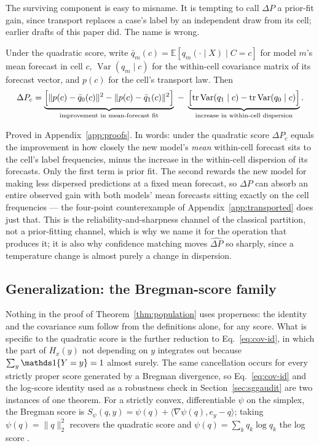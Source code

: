 The surviving component is easy to misname. It is tempting to call $\Delta P$ a prior-fit
gain, since transport replaces a case's label by an independent draw from its cell; earlier
drafts of this paper did. The name is wrong.

\begin{proposition}\label{prop:transported}
Under the quadratic score, write $\bar q_m(c)=\mathbb E[q_m(\cdot\mid X)\mid C=c]$ for
model $m$'s mean forecast in cell $c$, $\operatorname{Var}(q_m\mid c)$ for the
within-cell covariance matrix of its forecast vector, and $p(c)$ for the cell's transport
law. Then
\begin{equation}
\Delta P_c=
\underbrace{\Bigl[\lVert p(c)-\bar q_0(c)\rVert^2-\lVert p(c)-\bar q_1(c)\rVert^2\Bigr]}
_{\text{improvement in mean-forecast fit}}
\;-\;
\underbrace{\Bigl[\operatorname{tr}\operatorname{Var}(q_1\mid c)-
\operatorname{tr}\operatorname{Var}(q_0\mid c)\Bigr]}_{\text{increase in within-cell dispersion}} .
\label{eq:transported-composition}
\end{equation}
\end{proposition}

\noindent
Proved in Appendix~\ref{app:proofs}. In words: under the quadratic score $\Delta P_c$ equals
the improvement in how closely the new model's \emph{mean} within-cell forecast sits to the
cell's label frequencies, minus the increase in the within-cell dispersion of its forecasts. Only the first term is prior fit.
The second rewards the new model for making less dispersed predictions at a fixed mean
forecast, so $\Delta P$ can absorb an entire observed gain with both models' mean forecasts
sitting exactly on the cell frequencies --- the four-point counterexample of
Appendix~\ref{app:transported} does just that. This is the reliability-and-sharpness channel of the classical partition, not a
prior-fitting channel, which is why we name it for the operation that produces it; it is also
why confidence matching moves $\widehat{\Delta P}$ so sharply, since a temperature change is
almost purely a change in dispersion.

\subsection{Generalization: the Bregman-score family}\label{sec:bregman}

Nothing in the proof of Theorem~\ref{thm:population} uses properness: the identity and the
covariance sum follow from the definitions alone, for any score. What is specific to the
quadratic score is the further reduction to Eq.~\eqref{eq:cov-id}, in which the part of
$H_x(y)$ not depending on $y$ integrates out because $\sum_y\ind\{Y=y\}=1$ almost surely.
The same cancellation occurs for every strictly proper score generated by a Bregman
divergence, so Eq.~\eqref{eq:cov-id} and the log-score identity used as a robustness check
in Section~\ref{sec:sggaudit} are two instances of one theorem. For a strictly convex,
differentiable $\psi$ on the simplex, the Bregman score is
$S_\psi(q,y)=\psi(q)+\langle\nabla\psi(q),e_y-q\rangle$; taking $\psi(q)=\lVert q\rVert_2^2$
recovers the quadratic score and $\psi(q)=\sum_kq_k\log q_k$ the log score
\citep{gneiting2007proper}.

